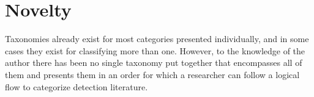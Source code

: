 \section{Novelty} Taxonomies already exist for most categories presented individually, and in some cases they exist for classifying more than one.
However, to the knowledge of the author there has been no single taxonomy put together that encompasses all of them and presents them in an order for which a researcher can follow a logical flow to categorize detection literature.